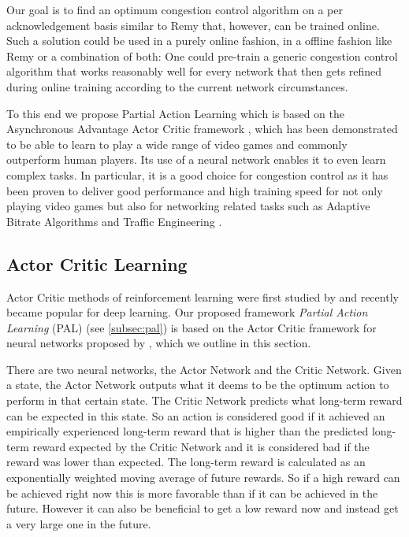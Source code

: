 \documentclass[10pt,sigconf,anonymous]{acmart}
\begin{document}
Our goal is to find an optimum congestion control algorithm on a per acknowledgement basis similar to Remy that, however, can be trained online.  Such a solution could be used in a purely online fashion, in a offline fashion like Remy or a combination of both: One could pre-train a generic congestion control algorithm that works reasonably well for every network that then gets refined during online training according to the current network circumstances. 

To this end we propose Partial Action Learning which is based on the Asynchronous Advantage Actor Critic framework \cite{mnih_asynchronous_2016}, which has been demonstrated to be able to learn to play a wide range of video games and commonly outperform human players. Its use of a neural network enables it to even learn complex tasks. In particular, it is a good choice for congestion control as it has been proven to deliver good performance and high training speed for not only playing video games but also for networking related tasks such as Adaptive Bitrate Algorithms \cite{mao_neural_2017} and Traffic Engineering \cite{xu_experience-driven_2018}. 

\subsection{Actor Critic Learning}
\label{subsec:ac}

Actor Critic methods of reinforcement learning were first studied by \cite{sutton_policy_1999} and recently became popular for deep learning. Our proposed framework \textit{Partial Action Learning} (PAL) (see \ref{subsec:pal}) is based on the Actor Critic framework for neural networks proposed by \citet{mnih_asynchronous_2016}, which we outline in this section. 

There are two neural networks, the Actor Network and the Critic Network. Given a state, the Actor Network outputs what it deems to be the optimum action to perform in that certain state. The Critic Network predicts what long-term reward can be expected in this state. So an action is considered good if it achieved an empirically experienced long-term reward that is higher than the predicted long-term reward expected by the Critic Network and it is considered bad if the reward was lower than expected. The long-term reward is calculated as an exponentially weighted moving average of future rewards. So if a high reward can be achieved right now this is more favorable than if it can be achieved in the future. However it can also be beneficial to get a low reward now and instead get a very large one in the future. 
\end{document}
